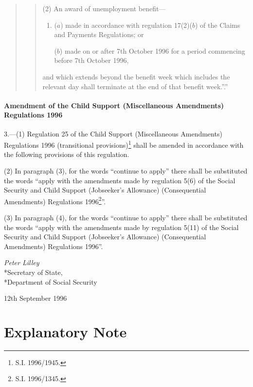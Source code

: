 \documentclass[a4paper]{article}
\begin{document}
\begin{quotation}
\begin{quotation}
(2) An award of unemployment benefit—
\begin{enumerate}\item[]
($a$) made in accordance with regulation 17(2)($b$) of the Claims and Payments Regulations; or

($b$) made on or after 7th October 1996 for a period commencing before 7th October 1996,
\end{enumerate}
and which extends beyond the benefit week which includes the relevant day shall terminate at the end of that benefit week.”.”
\end{quotation}
\end{quotation}

\subsection[3. Amendment of the Child Support (Miscellaneous Amendments) Regulations 1996]{\sloppy Amendment of the Child Support (Miscellaneous Amendments) Regulations 1996}

3.—(1) Regulation 25 of the Child Support (Miscellaneous Amendments) Regulations 1996 (transitional provisions)\footnote{\frenchspacing S.I. 1996/1945.} shall be amended in accordance with the following provisions of this regulation.

(2) In paragraph (3), for the words “continue to apply” there shall be substituted the words “apply with the amendments made by regulation 5(6) of the Social Security and Child Support (Jobseeker’s Allowance) (Consequential Amendments) Regulations 1996\footnote{\frenchspacing S.I. 1996/1345.}”.

(3) In paragraph (4), for the words “continue to apply” there shall be substituted the words “apply with the amendments made by regulation 5(11) of the Social Security and Child Support (Jobseeker’s Allowance) (Consequential Amendments) Regulations 1996”.

\bigskip


{\raggedleft
\emph{Peter Lilley}\\*Secretary of State,\\*Department of Social Security

}

12th September 1996

\bigskip

\part{Explanatory Note}
\end{document}
